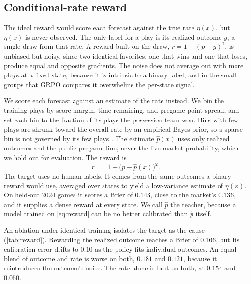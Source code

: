\subsection{Conditional-rate reward}
\label{sec:reward}

The ideal reward would score each forecast against the true rate $\eta(x)$, but $\eta(x)$ is never
observed. The only label for a play is its realized outcome $y$, a single draw from that rate. A reward
built on the draw, $r=1-(p-y)^2$, is unbiased but noisy, since two identical favorites, one that wins
and one that loses, produce equal and opposite gradients. The noise does not average out with more plays
at a fixed state, because it is intrinsic to a binary label, and in the small groups that GRPO compares
\citep{grpo} it overwhelms the per-state signal.

We score each forecast against an estimate of the rate instead. We bin the training plays by score
margin, time remaining, and pregame point spread, and set each bin to the fraction of its plays the
possession team won. Bins with few plays are shrunk toward the overall rate by an empirical-Bayes prior,
so a sparse bin is not governed by its few plays \citep{efron_morris1975}. The estimate
$\hat p(x)$ uses only realized outcomes and the public pregame line, never the live market probability,
which we hold out for evaluation. The reward is
\begin{equation}
  r \;=\; 1 - \bigl(p - \hat p(x)\bigr)^2 .
  \label{eq:reward}
\end{equation}
The target uses no human labels. It comes from the same outcomes a binary reward would use, averaged
over states to yield a low-variance estimate of $\eta(x)$. On held-out 2024 games it scores a Brier of
$0.143$, close to the market's $0.136$, and it supplies a dense reward at every state. We call $\hat p$
the teacher, because a model trained on \cref{eq:reward} can be no better calibrated than $\hat p$
itself.

An ablation under identical training isolates the target as the cause (\cref{tab:reward}). Rewarding the
realized outcome reaches a Brier of $0.166$, but its calibration error drifts to $0.10$ as the policy
fits individual outcomes. An equal blend of outcome and rate is worse on both, $0.181$ and $0.121$,
because it reintroduces the outcome's noise. The rate alone is best on both, at $0.154$ and $0.050$.

\begin{table}[t]
\centering

\caption{Reward-target ablation under identical training (direct prediction, \cref{sec:decoupling};
in-training held-out, $n=128$). The realized-outcome reward is higher-variance and its calibration
drifts; blending the outcome back in is worse on both axes; the conditional rate $\hat p$ is the most
accurate and the most stable.}
\label{tab:reward}
\end{table}
